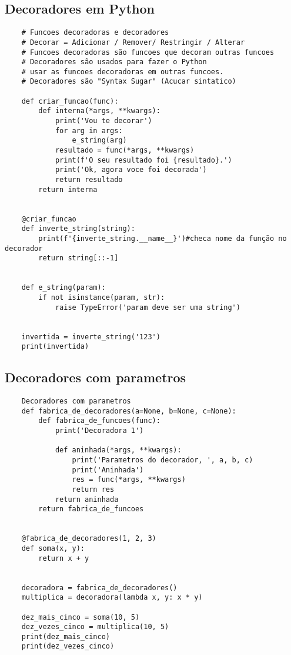 \documentclass{article}
\begin{document}
\subsection{Decoradores em Python}
\begin{lstlisting}
    # Funcoes decoradoras e decoradores
    # Decorar = Adicionar / Remover/ Restringir / Alterar
    # Funcoes decoradoras são funcoes que decoram outras funcoes
    # Decoradores são usados para fazer o Python
    # usar as funcoes decoradoras em outras funcoes.
    # Decoradores são "Syntax Sugar" (Acucar sintatico)
    
    def criar_funcao(func):
        def interna(*args, **kwargs):
            print('Vou te decorar')
            for arg in args:
                e_string(arg)
            resultado = func(*args, **kwargs)
            print(f'O seu resultado foi {resultado}.')
            print('Ok, agora voce foi decorada')
            return resultado
        return interna
    
    
    @criar_funcao
    def inverte_string(string):
        print(f'{inverte_string.__name__}')#checa nome da função no decorador
        return string[::-1]
    
    
    def e_string(param):
        if not isinstance(param, str):
            raise TypeError('param deve ser uma string')
    
    
    invertida = inverte_string('123')
    print(invertida)
\end{lstlisting}    
\subsection{Decoradores com parametros}
\begin{lstlisting}
    Decoradores com parametros
    def fabrica_de_decoradores(a=None, b=None, c=None):
        def fabrica_de_funcoes(func):
            print('Decoradora 1')
    
            def aninhada(*args, **kwargs):
                print('Parametros do decorador, ', a, b, c)
                print('Aninhada')
                res = func(*args, **kwargs)
                return res
            return aninhada
        return fabrica_de_funcoes
    
    
    @fabrica_de_decoradores(1, 2, 3)
    def soma(x, y):
        return x + y
    
    
    decoradora = fabrica_de_decoradores()
    multiplica = decoradora(lambda x, y: x * y)
    
    dez_mais_cinco = soma(10, 5)
    dez_vezes_cinco = multiplica(10, 5)
    print(dez_mais_cinco)
    print(dez_vezes_cinco)
\end{lstlisting}
\end{document}
